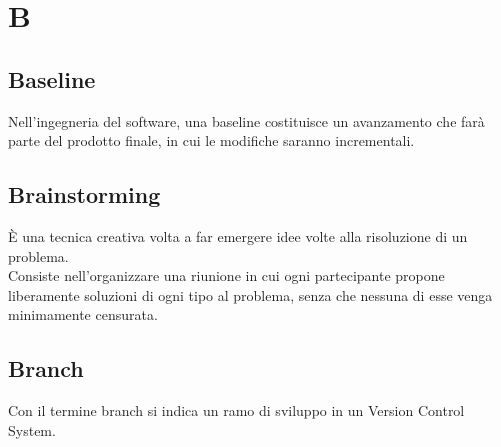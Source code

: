 \section{B}
	\subsection{Baseline}
		Nell'ingegneria del software, una baseline costituisce un avanzamento che farà parte del prodotto finale, in cui le modifiche saranno incrementali.
	\subsection{Brainstorming }  
		È una tecnica creativa volta a far emergere idee volte alla risoluzione di un problema. \\
		Consiste nell'organizzare una riunione in cui ogni partecipante propone liberamente soluzioni di ogni tipo al problema, senza che nessuna di esse venga minimamente censurata.
	\subsection{Branch}  
		Con il termine branch si indica un ramo di sviluppo in un Version Control System.

\newpage